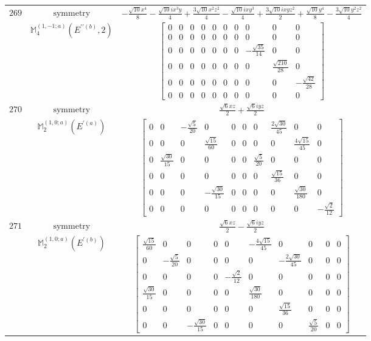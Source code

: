 \documentclass[fleqn,8pt,landscape]{jsarticle}
\begin{document}
\begin{longtable}{ccc}
$ 269 $ & $ \text{symmetry} $ & $ - \frac{\sqrt{10} x^{4}}{8} - \frac{\sqrt{10} i x^{3} y}{4} + \frac{3 \sqrt{10} x^{2} z^{2}}{4} - \frac{\sqrt{10} i x y^{3}}{4} + \frac{3 \sqrt{10} i x y z^{2}}{2} + \frac{\sqrt{10} y^{4}}{8} - \frac{3 \sqrt{10} y^{2} z^{2}}{4} $ \\
$  $ & $ \mathbb{M}_{4}^{(1,-1;a)}(E^{\prime\prime(b)},2) $ & $ \begin{bmatrix} 0 & 0 & 0 & 0 & 0 & 0 & 0 & 0 & 0 & 0 \\ 0 & 0 & 0 & 0 & 0 & 0 & 0 & 0 & 0 & 0 \\ 0 & 0 & 0 & 0 & 0 & 0 & 0 & - \frac{\sqrt{35}}{14} & 0 & 0 \\ 0 & 0 & 0 & 0 & 0 & 0 & 0 & 0 & \frac{\sqrt{210}}{28} & 0 \\ 0 & 0 & 0 & 0 & 0 & 0 & 0 & 0 & 0 & - \frac{\sqrt{42}}{28} \\ 0 & 0 & 0 & 0 & 0 & 0 & 0 & 0 & 0 & 0 \end{bmatrix} $ \\ \hline
$ 270 $ & $ \text{symmetry} $ & $ \frac{\sqrt{6} x z}{2} + \frac{\sqrt{6} i y z}{2} $ \\
$  $ & $ \mathbb{M}_{2}^{(1,0;a)}(E^{\prime(a)}) $ & $ \begin{bmatrix} 0 & 0 & - \frac{\sqrt{5}}{20} & 0 & 0 & 0 & 0 & \frac{2 \sqrt{30}}{45} & 0 & 0 \\ 0 & 0 & 0 & \frac{\sqrt{15}}{60} & 0 & 0 & 0 & 0 & \frac{4 \sqrt{15}}{45} & 0 \\ 0 & \frac{\sqrt{30}}{15} & 0 & 0 & 0 & 0 & \frac{\sqrt{5}}{20} & 0 & 0 & 0 \\ 0 & 0 & 0 & 0 & 0 & 0 & 0 & \frac{\sqrt{15}}{36} & 0 & 0 \\ 0 & 0 & 0 & - \frac{\sqrt{30}}{15} & 0 & 0 & 0 & 0 & \frac{\sqrt{30}}{180} & 0 \\ 0 & 0 & 0 & 0 & 0 & 0 & 0 & 0 & 0 & - \frac{\sqrt{2}}{12} \end{bmatrix} $ \\ \hline
$ 271 $ & $ \text{symmetry} $ & $ \frac{\sqrt{6} x z}{2} - \frac{\sqrt{6} i y z}{2} $ \\
$  $ & $ \mathbb{M}_{2}^{(1,0;a)}(E^{\prime(b)}) $ & $ \begin{bmatrix} \frac{\sqrt{15}}{60} & 0 & 0 & 0 & 0 & - \frac{4 \sqrt{15}}{45} & 0 & 0 & 0 & 0 \\ 0 & - \frac{\sqrt{5}}{20} & 0 & 0 & 0 & 0 & - \frac{2 \sqrt{30}}{45} & 0 & 0 & 0 \\ 0 & 0 & 0 & 0 & - \frac{\sqrt{2}}{12} & 0 & 0 & 0 & 0 & 0 \\ \frac{\sqrt{30}}{15} & 0 & 0 & 0 & 0 & \frac{\sqrt{30}}{180} & 0 & 0 & 0 & 0 \\ 0 & 0 & 0 & 0 & 0 & 0 & \frac{\sqrt{15}}{36} & 0 & 0 & 0 \\ 0 & 0 & - \frac{\sqrt{30}}{15} & 0 & 0 & 0 & 0 & \frac{\sqrt{5}}{20} & 0 & 0 \end{bmatrix} $ \\ \hline

\end{longtable}
\end{document}
